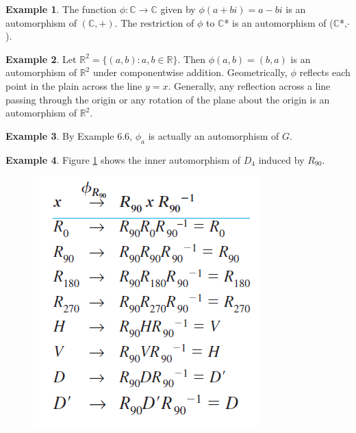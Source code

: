 \documentclass{article}
\newtheorem{theorem}{Theorem}[section]
\theoremstyle{definition}
\newtheorem{definition}{Definition}[section]
\newtheorem{example}{Example}[section]
\begin{document}
 \begin{example}
     The function $\phi: \mathbb{C} \to \mathbb{C}$ given by $\phi(a+bi) = a-bi$ is an automorphism of $(\mathbb{C},+)$. The restriction of $\phi$ to $\mathbb{C}$* is an automorphism of ($\mathbb{C}$*,$\cdot$).
 \end{example}
 
 \begin{example}
     Let $\mathbb{R}^2 = \{(a,b): a,b \in \mathbb{R}\}$. Then $\phi(a,b)=(b,a)$ is an automorphism of $\mathbb{R}^2$ under componentwise addition. Geometrically, $\phi$ reflects each point in the plain across the line $y=x$. Generally, any reflection across a line passing through the origin or any rotation of the plane about the origin is an automorphism of $\mathbb{R}^2$.
 \end{example}
 
 \noindent{}
 
 \begin{example}
     By Example 6.6, $\phi_a$ is actually an automorphism of $G$.
 \end{example}
 
 \begin{example}
    Figure \ref{example 6.14} shows the inner automorphism of $D_4$ induced by $R_{90}$.
     \begin{figure}
         \centering
         \includegraphics[width=0.4\linewidth]{figures/example6.14.png}
         \caption{}
         \label{example 6.14}
     \end{figure}
 \end{example}
 
 \noindent{}
 \\ \\
 
\end{document}
